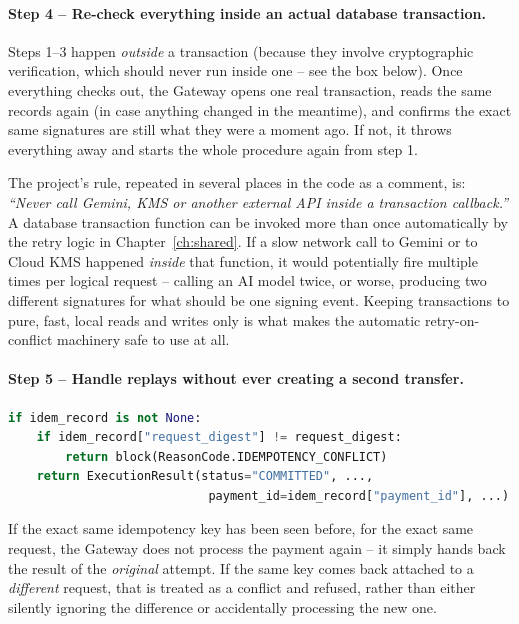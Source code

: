 \documentclass[11pt]{report}
\begin{document}
\paragraph{Step 4 -- Re-check everything inside an actual database transaction.}

Steps 1--3 happen \emph{outside} a transaction (because they involve
cryptographic verification, which should never run inside one -- see the
box below). Once everything checks out, the Gateway opens one real
transaction, reads the same records again (in case anything changed in
the meantime), and confirms the exact same signatures are still what they
were a moment ago. If not, it throws everything away and starts the whole
procedure again from step 1.

\begin{whyitmatters}
The project's rule, repeated in several places in the code as a comment,
is: \emph{``Never call Gemini, KMS or another external API inside a
transaction callback.''} A database transaction function can be invoked
more than once automatically by the retry logic in
Chapter~\ref{ch:shared}. If a slow network call to Gemini or to Cloud KMS
happened \emph{inside} that function, it would potentially fire multiple
times per logical request -- calling an AI model twice, or worse,
producing two different signatures for what should be one signing event.
Keeping transactions to pure, fast, local reads and writes only is what
makes the automatic retry-on-conflict machinery safe to use at all.
\end{whyitmatters}

\paragraph{Step 5 -- Handle replays without ever creating a second transfer.}

\begin{lstlisting}[language=Python]
if idem_record is not None:
    if idem_record["request_digest"] != request_digest:
        return block(ReasonCode.IDEMPOTENCY_CONFLICT)
    return ExecutionResult(status="COMMITTED", ...,
                            payment_id=idem_record["payment_id"], ...)
\end{lstlisting}

If the exact same idempotency key has been seen before, for the exact
same request, the Gateway does not process the payment again -- it simply
hands back the result of the \emph{original} attempt. If the same key
comes back attached to a \emph{different} request, that is treated as a
conflict and refused, rather than either silently ignoring the
difference or accidentally processing the new one.
\end{document}
